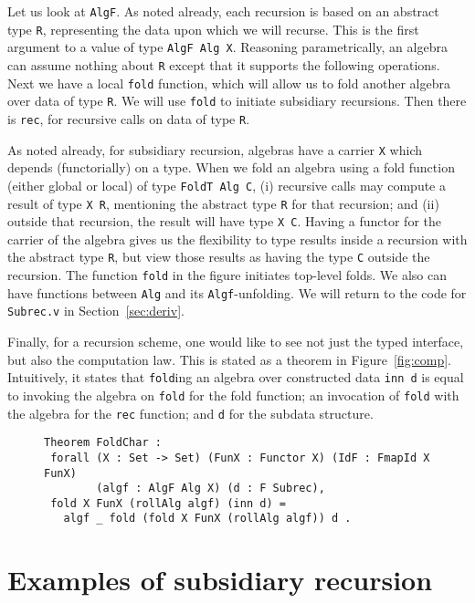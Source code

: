 \documentclass[a4paper,USenglish]{lipics-v2021}
\begin{document}
Let us look at \verb|AlgF|.  As noted already, each recursion is based
on an abstract type \verb|R|, representing the data upon which we will
recurse.  This is the first argument to a value of type
\verb|AlgF Alg X|.  Reasoning parametrically, an algebra can assume
nothing about \verb|R| except that it supports the following
operations.  Next we have a local
\texttt{fold} function, which will allow us to fold another algebra over data
of type \verb|R|.  We will use \verb|fold| to initiate subsidiary
recursions.  Then there is \verb|rec|, for recursive calls on data of
type \verb|R|.

As noted already, for subsidiary recursion, algebras have a carrier
\verb|X| which depends (functorially) on a type.  When we fold an
algebra using a fold function (either global or local) of type
\verb|FoldT Alg C|, (i) recursive calls may compute a result of type
\verb|X R|, mentioning the abstract type \verb|R| for that recursion;
and (ii) outside that recursion, the result will have type \verb|X C|.
Having a functor for the carrier of the algebra gives us the
flexibility to type results inside a recursion with the abstract type
\verb|R|, but view those results as having the type \verb|C| outside
the recursion.  The function \verb|fold| in the figure initiates
top-level folds.  We also can have functions 
between \verb|Alg| and its \verb|Algf|-unfolding.  We will
return to the code for \verb|Subrec.v| in Section~\ref{sec:deriv}.

Finally, for a recursion scheme, one would like to see not just the
typed interface, but also the computation law.  This is stated as a
theorem in Figure~\ref{fig:comp}.  Intuitively, it states that
\verb|fold|ing an algebra over constructed data \verb|inn d| is equal
to invoking the algebra on \verb|fold|
for the fold function; an invocation of \verb|fold| with the algebra
for the \verb|rec| function; and \verb|d| for the subdata structure.

\begin{figure}
\begin{verbatim}
Theorem FoldChar :
 forall (X : Set -> Set) (FunX : Functor X) (IdF : FmapId X FunX)
        (algf : AlgF Alg X) (d : F Subrec),
 fold X FunX (rollAlg algf) (inn d) =
   algf _ fold (fold X FunX (rollAlg algf)) d .
\end{verbatim}
\end{figure}

\section{Examples of subsidiary recursion}
\label{sec:examples}
\end{document}
